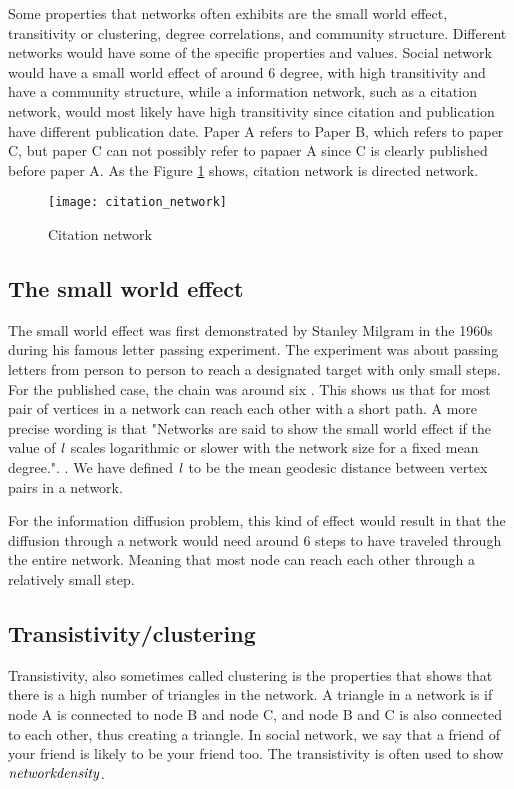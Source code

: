 Some properties that networks often exhibits are the small world effect, transitivity or clustering, degree correlations, and community structure\cite{ComplexNetwork2003}. Different networks would have some of the specific properties and values. Social network would have a small world effect of around 6 degree, with high transitivity and have a community structure, while a information network, such as a citation network, would most likely have high transitivity since citation and publication have different publication date. Paper A refers to Paper B, which refers to paper C, but paper C can not possibly refer to papaer A since C is clearly published before paper A. As the Figure \ref{fig:CitationN} shows, citation network is directed network.

\begin{figure}[!ht]
	\texttt{[image: citation\_network]}
	\caption{Citation network} 
	\label{fig:CitationN}
\end{figure}

\subsection{The small world effect}
The small world effect was first demonstrated by Stanley Milgram in the 1960s during his famous letter passing experiment\cite{SmallWorldProblemSmilgram1960}. The experiment was about passing letters from person to person to reach a designated target with only small steps. For the published case, the chain was around six \cite{Experiment1969}. This shows us that for most pair of vertices in a network can reach each other with a short path. A more precise wording is that "Networks are said to show the small world effect if the value of $\it{l}$ scales logarithmic or slower with the network size for a fixed mean degree.". \cite{ComplexNetwork2003}. We have defined $\it{l} $ to be the mean geodesic distance between vertex pairs in a network.

For the information diffusion problem, this kind of effect would result in that the  diffusion through a network would need around 6 steps to have traveled through the entire network. Meaning that most node can reach each other through a relatively small step.

\subsection{Transistivity/clustering}
Transistivity, also sometimes called clustering is the properties that shows that there is a high number of triangles in the network. A triangle in a network is if node A is connected to node B and node C, and node B and C is also connected to each other, thus creating a triangle. In social network, we say that a friend of your friend is likely to be your friend too\cite{ComplexNetwork2003}. The transistivity is often used to show $\it{network density}$.


